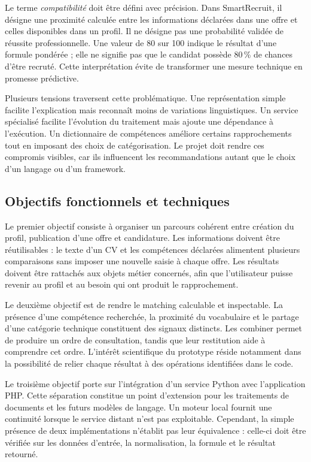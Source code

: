 Le terme \emph{compatibilité} doit être défini avec précision. Dans SmartRecruit, il désigne une proximité calculée entre les informations déclarées dans une offre et celles disponibles dans un profil. Il ne désigne pas une probabilité validée de réussite professionnelle. Une valeur de 80 sur 100 indique le résultat d'une formule pondérée ; elle ne signifie pas que le candidat possède 80\,\% de chances d'être recruté. Cette interprétation évite de transformer une mesure technique en promesse prédictive.

Plusieurs tensions traversent cette problématique. Une représentation simple facilite l'explication mais reconnaît moins de variations linguistiques. Un service spécialisé facilite l'évolution du traitement mais ajoute une dépendance à l'exécution. Un dictionnaire de compétences améliore certains rapprochements tout en imposant des choix de catégorisation. Le projet doit rendre ces compromis visibles, car ils influencent les recommandations autant que le choix d'un langage ou d'un framework.

\subsection{Objectifs fonctionnels et techniques}

Le premier objectif consiste à organiser un parcours cohérent entre création du profil, publication d'une offre et candidature. Les informations doivent être réutilisables : le texte d'un CV et les compétences déclarées alimentent plusieurs comparaisons sans imposer une nouvelle saisie à chaque offre. Les résultats doivent être rattachés aux objets métier concernés, afin que l'utilisateur puisse revenir au profil et au besoin qui ont produit le rapprochement.

Le deuxième objectif est de rendre le matching calculable et inspectable. La présence d'une compétence recherchée, la proximité du vocabulaire et le partage d'une catégorie technique constituent des signaux distincts. Les combiner permet de produire un ordre de consultation, tandis que leur restitution aide à comprendre cet ordre. L'intérêt scientifique du prototype réside notamment dans la possibilité de relier chaque résultat à des opérations identifiées dans le code.

Le troisième objectif porte sur l'intégration d'un service Python avec l'application PHP. Cette séparation constitue un point d'extension pour les traitements de documents et les futurs modèles de langage. Un moteur local fournit une continuité lorsque le service distant n'est pas exploitable. Cependant, la simple présence de deux implémentations n'établit pas leur équivalence : celle-ci doit être vérifiée sur les données d'entrée, la normalisation, la formule et le résultat retourné.

